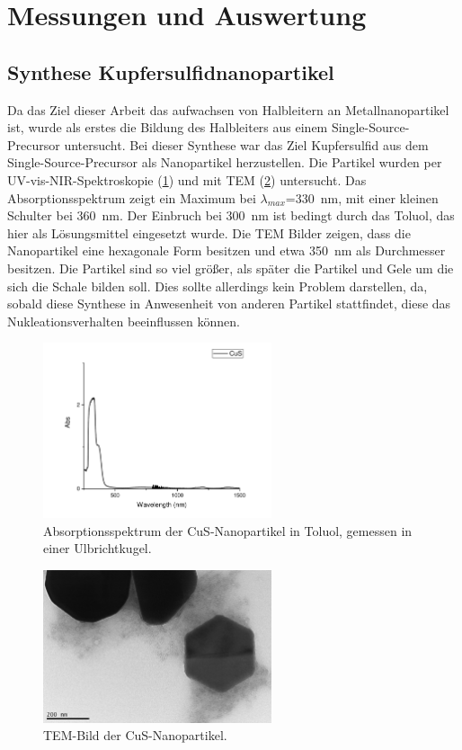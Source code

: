 \section{Messungen und Auswertung}

\subsection{Synthese Kupfersulfidnanopartikel}
	Da das Ziel dieser Arbeit das aufwachsen von Halbleitern an Metallnanopartikel ist, wurde als erstes die Bildung des Halbleiters aus einem Single-Source-Precursor untersucht.
	Bei dieser Synthese war das Ziel Kupfersulfid aus dem Single-Source-Precursor  als Nanopartikel herzustellen. 
	Die Partikel wurden per UV-vis-NIR-Spektroskopie (\cref{fig:UV-CuS}) und mit TEM (\cref{fig:TEM-CuS}) untersucht.
	Das Absorptionsspektrum zeigt ein Maximum bei $\lambda_{max}$=\SI{330}{\nano\meter}, mit einer kleinen Schulter bei \SI{360}{\nano\meter}.
	Der Einbruch bei \SI{300}{\nano\meter} ist bedingt durch das Toluol, das hier als Lösungsmittel eingesetzt wurde.
	Die TEM Bilder zeigen, dass die Nanopartikel eine hexagonale Form besitzen und etwa \SI{350}{\nano\meter} als Durchmesser besitzen.
	Die Partikel sind so viel größer, als später die Partikel und Gele um die sich die Schale bilden soll.
	Dies sollte allerdings kein Problem darstellen, da, sobald diese Synthese in Anwesenheit von anderen Partikel stattfindet, diese das Nukleationsverhalten beeinflussen können.
	
	
	\begin{figure}[H]
		\centering
		\includegraphics[width=0.6\textwidth]{Bilder/UV-CuS} 	
		\caption{Absorptionsspektrum der CuS-Nanopartikel in Toluol, gemessen in einer Ulbrichtkugel.}
		\label{fig:UV-CuS}
	\end{figure}
	
	\begin{figure}[H]
		\centering
		\includegraphics[width=0.6\textwidth]{Bilder/TEM-CuS} 	
		\caption{TEM-Bild der CuS-Nanopartikel.}
		\label{fig:TEM-CuS}
	\end{figure}
	
